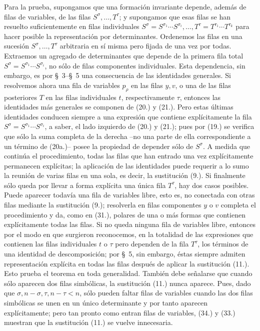 \documentclass[11pt]{article}
\begin{document}
Para la prueba, supongamos que una formación invariante depende, además de filas de variables, de las filas $S^\sigma,\ldots,T^\tau$; y supongamos que esas filas se han resuelto suficientemente en filas individuales $S^\sigma=S^{\sigma_1}\cdots S^{\sigma_i},\ldots,T^\tau=T^{\tau_1}\cdots T^{\tau_k}$ para hacer posible la representación por determinantes. Ordenemos las filas en una sucesión $S^\sigma,\ldots,T^\tau$ arbitraria en sí misma pero fijada de una vez por todas. Extraemos un agregado de determinantes que depende de la primera fila total $S^\sigma=S^{\sigma_1}\cdots S^{\sigma_i}$, no sólo de filas componentes individuales. Esta dependencia, sin embargo, es por \S\ 3--\S\ 5 una consecuencia de las identidades generales. Si resolvemos ahora una fila de variables $p_\rho$ en las filas $y,v$, o una de las filas posteriores $T$ en las filas individuales $t$, respectivamente $\tau$, entonces las identidades más generales se componen de (20.) y (21.). Pero estas últimas identidades conducen siempre a una expresión que contiene explícitamente la fila $S^\sigma=S^{\sigma_1}\cdots S^{\sigma_i}$, a saber, el lado izquierdo de (20.) y (21.); pues por (19.) se verifica que sólo la suma completa de la derecha --no una parte de ella correspondiente a un término de (20a.)-- posee la propiedad de depender sólo de $S^\sigma$. A medida que continúa el procedimiento, todas las filas que han entrado una vez explícitamente permanecen explícitas; la aplicación de las identidades puede requerir a lo sumo la reunión de varias filas en una sola, es decir, la sustitución (9.). Si finalmente sólo queda por llevar a forma explícita una única fila $T^\tau$, hay dos casos posibles. Puede aparecer todavía una fila de variables libre, esto es, no conectada con otras filas mediante la sustitución (9.); resolverla en filas componentes $y$ o $v$ completa el procedimiento y da, como en (31.), polares de una o más formas que contienen explícitamente todas las filas. Si no queda ninguna fila de variables libre, entonces por el modo en que surgieron reconocemos, en la totalidad de las expresiones que contienen las filas individuales $t$ o $\tau$ pero dependen de la fila $T^\tau$, los términos de una identidad de descomposición; por \S\ 5, sin embargo, éstas siempre admiten representación explícita en todas las filas después de aplicar la sustitución (11.). Esto prueba el teorema en toda generalidad. También debe señalarse que cuando sólo aparecen dos filas simbólicas, la sustitución (11.) nunca aparece. Pues, dado que $\sigma,n-\sigma,\tau,n-\tau<n$, sólo pueden faltar filas de variables cuando las dos filas simbólicas se unen en un único determinante y por tanto aparecen explícitamente; pero tan pronto como entran filas de variables, (34.) y (33.) muestran que la sustitución (11.) se vuelve innecesaria.
\end{document}
